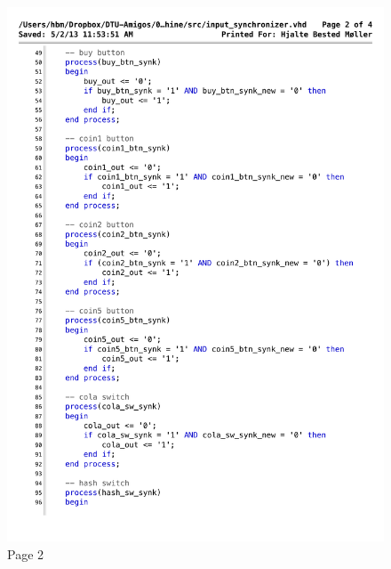 \begin{figure}[!h]
\centering
\includegraphics[scale=0.6]{figs/input_synchronizer_2.pdf}
\caption{Page 2}
\label{vhd:inpsync2}
\end{figure}


